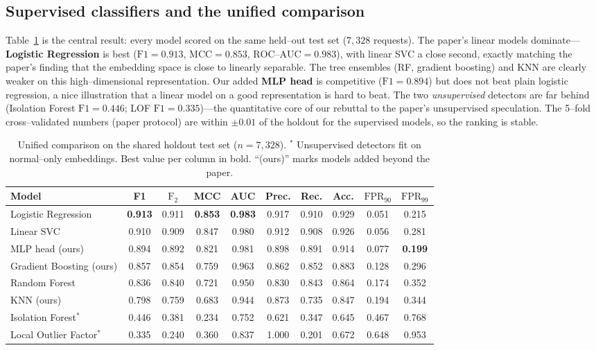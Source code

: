 \documentclass[11pt,a4paper]{article}
\begin{document}
\subsection{Supervised classifiers and the unified comparison}
Table~\ref{tab:holdout} is the central result: every model scored on the same held--out
test set ($7{,}328$ requests). The paper's linear models dominate---\textbf{Logistic
Regression} is best ($\text{F1}=0.913$, $\text{MCC}=0.853$, $\text{ROC--AUC}=0.983$),
with linear SVC a close second, exactly matching the paper's finding that the embedding
space is close to linearly separable. The tree ensembles (RF, gradient boosting) and KNN
are clearly weaker on this high--dimensional representation. Our added \textbf{MLP head}
is competitive ($\text{F1}=0.894$) but does not beat plain logistic regression, a nice
illustration that a linear model on a good representation is hard to beat. The two
\emph{unsupervised} detectors are far behind (Isolation Forest $\text{F1}=0.446$; LOF
$\text{F1}=0.335$)---the quantitative core of our rebuttal to the paper's unsupervised
speculation. The 5--fold cross--validated numbers (paper protocol) are within $\pm0.01$
of the holdout for the supervised models, so the ranking is stable.

\begin{table}[H]
  \centering
  \footnotesize
  \setlength{\tabcolsep}{4.5pt}
  \begin{tabular}{lccccccccc}
    \toprule
    Model & F1 & $\text{F}_2$ & MCC & AUC & Prec. & Rec. & Acc. & $\text{FPR}_{90}$ & $\text{FPR}_{99}$\\
    \midrule
    Logistic Regression        & \textbf{0.913} & 0.911 & \textbf{0.853} & \textbf{0.983} & 0.917 & 0.910 & 0.929 & 0.051 & 0.215\\
    Linear SVC                 & 0.910 & 0.909 & 0.847 & 0.980 & 0.912 & 0.908 & 0.926 & 0.056 & 0.281\\
    MLP head (ours)            & 0.894 & 0.892 & 0.821 & 0.981 & 0.898 & 0.891 & 0.914 & 0.077 & \textbf{0.199}\\
    Gradient Boosting (ours)   & 0.857 & 0.854 & 0.759 & 0.963 & 0.862 & 0.852 & 0.883 & 0.128 & 0.296\\
    Random Forest              & 0.836 & 0.840 & 0.721 & 0.950 & 0.830 & 0.843 & 0.864 & 0.174 & 0.352\\
    KNN (ours)                 & 0.798 & 0.759 & 0.683 & 0.944 & 0.873 & 0.735 & 0.847 & 0.194 & 0.344\\
    \midrule
    Isolation Forest$^{\ast}$      & 0.446 & 0.381 & 0.234 & 0.752 & 0.621 & 0.347 & 0.645 & 0.467 & 0.768\\
    Local Outlier Factor$^{\ast}$  & 0.335 & 0.240 & 0.360 & 0.837 & 1.000 & 0.201 & 0.672 & 0.648 & 0.953\\
    \bottomrule
  \end{tabular}
  \caption{Unified comparison on the shared holdout test set ($n=7{,}328$). $^{\ast}$
  Unsupervised detectors fit on normal--only embeddings. Best value per column in bold.
  ``(ours)'' marks models added beyond the paper.}
  \label{tab:holdout}
\end{table}
\end{document}
